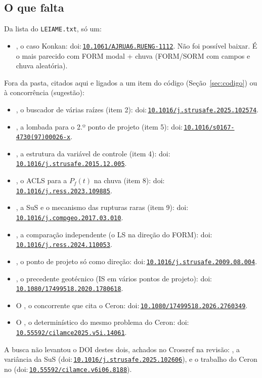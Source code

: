 \documentclass[11pt,a4paper]{article}
\newcommand{\doi}[1]{doi:\,\href{https://doi.org/#1}{\nolinkurl{#1}}}
\begin{document}
\subsection{O que falta}
Da lista do \texttt{LEIAME.txt}, só um:
\begin{itemize}
  \item \citet{raghuram2024}, o caso Konkan: \doi{10.1061/AJRUA6.RUENG-1112}. Não foi possível baixar. É o mais parecido
    com FORM modal + chuva (FORM/SORM com campos e chuva aleatória).
\end{itemize}
Fora da pasta, citados aqui e ligados a um item do código (Seção~\ref{sec:codigo}) ou à concorrência (sugestão):
{\raggedright
\begin{itemize}[itemsep=0pt]
  \item \citet{cheng2025}, o buscador de várias raízes (item 2): \doi{10.1016/j.strusafe.2025.102574}.
  \item \citet{derkiureghian1998}, a lombada para o 2.º ponto de projeto (item 5): \doi{10.1016/s0167-4730(97)00026-x}.
  \item \citet{depina2016}, a estrutura da variável de controle (item 4): \doi{10.1016/j.strusafe.2015.12.005}.
  \item \citet{yuan2024}, o ACLS para a $P_f(t)$ na chuva (item 8): \doi{10.1016/j.ress.2023.109885}.
  \item \citet{vandeneijnden2017}, a SuS e o mecanismo das rupturas raras (item 9): \doi{10.1016/j.compgeo.2017.03.010}.
  \item \citet{dang2024}, a comparação independente (o LS na direção do FORM): \doi{10.1016/j.ress.2024.110053}.
  \item \citet{valdebenito2010}, o ponto de projeto só como direção: \doi{10.1016/j.strusafe.2009.08.004}.
  \item \citet{zhao2021}, o precedente geotécnico (IS em vários pontos de projeto): \doi{10.1080/17499518.2020.1780618}.
  \item O \citet{hsrlem2026}, o concorrente que cita o Ceron: \doi{10.1080/17499518.2026.2760349}.
  \item O \citet{cilamce2025}, o determinístico do mesmo problema do Ceron: \doi{10.55592/cilamce2025.v5i.14061}.
\end{itemize}}
A busca não levantou o DOI destes dois, achados no Crossref na revisão: \citet{susvar2025}, a variância da SuS
(\doi{10.1016/j.strusafe.2025.102606}), e o trabalho do Ceron no \citet{cilamce2024}
(\doi{10.55592/cilamce.v6i06.8188}).
\end{document}
